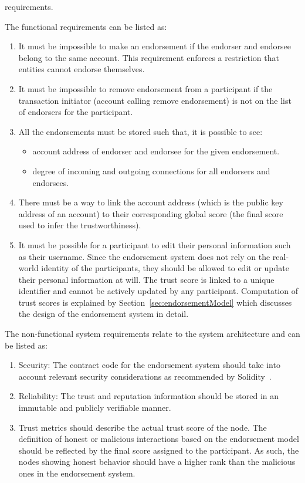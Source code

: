 requirements. \par
The functional requirements can be listed as: 
\begin{enumerate}
	\item It must be impossible to make an endorsement if the endorser and
		endorsee belong to the same account. This requirement enforces a
		restriction that entities cannot endorse themselves.  
	\item It must be impossible to remove endorsement from a participant if the
		transaction initiator (account calling remove endorsement) is not on
		the list of endorsers for the participant.
	\item All the endorsements must be stored such that, it is possible to see: 
		\begin{itemize}
			\item account address of endorser and endorsee for the given
				endorsement. 
			\item degree of incoming and outgoing connections for all endorsers
				and endorsees.
		\end{itemize}
	\item There must be a way to link the account address (which is the public
		key address of an account) to their corresponding global score (the
		final score used to infer the trustworthiness).
	\item It must be possible for a participant to edit their personal
		information such as their username. Since the endorsement system does
		not rely on the real-world identity of the participants, they should be
		allowed to edit or update their personal information at will. The trust
		score is linked to a unique identifier and cannot be actively updated
		by any participant.  Computation of trust scores is explained by
		Section~\ref{sec:endorsementModel} which discusses the design of the
		endorsement system in detail. 
\end{enumerate}
The non-functional system requirements relate to the system architecture and
can be listed as:
\begin{enumerate}
	\item Security: The contract code for the endorsement system should take
		into account relevant security considerations as recommended by
		Solidity~\cite{soliditySecurity}.
	\item Reliability: The  trust and reputation information should be stored
		in an immutable and publicly verifiable manner.
	\item Trust metrics should describe the actual trust score of the node. The
		definition of honest or malicious interactions based on the endorsement
		model should be reflected by the final score assigned to the
		participant. As such, the nodes showing honest behavior should have a
		higher rank than the malicious ones in the endorsement system. 
\end{enumerate}


